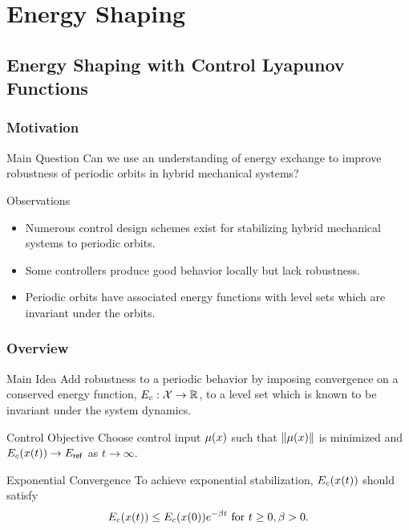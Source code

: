 \section{Energy Shaping}
\showtoc

\subsection{Energy Shaping with Control Lyapunov Functions}

\begin{frame}[t]
  \frametitle{Motivation}
  \begin{block}{Main Question}
    Can we use an understanding of energy exchange to improve robustness  of
    periodic orbits in hybrid mechanical systems?
  \end{block}

  \begin{block}{Observations}
    \begin{itemize}
    \item Numerous control design schemes exist for stabilizing hybrid mechanical
      systems to periodic orbits.
    \item Some controllers produce good behavior locally but lack robustness.
    \item Periodic orbits have associated energy functions with level sets which
      are invariant under the orbits.
    \end{itemize}
  \end{block}
\end{frame}

\begin{frame}[t]
  \frametitle{Overview}
  \begin{block}{Main Idea}
    Add robustness to a periodic behavior by imposing convergence on a conserved
    energy function, $E_{c} : \mathcal{X} \to \mathbb{R}$, to a level set which is known to be
    invariant under the system dynamics.
  \end{block}
  
  \begin{block}{Control Objective}
    Choose control input $\mu(x)$ such that $\| \mu(x) \|$ is minimized and
    $E_{c}(x(t)) \to E_{\mathsf{ref}}$ as $t \to \infty$.
  \end{block}

  \begin{block}{Exponential Convergence}
    To achieve exponential stabilization, $E_{c}(x(t))$ should satisfy\vspace{-.4em}
    \begin{align*}
      E_{c}(x(t)) \leq E_{c}(x(0)) e^{-\beta t} \mbox{ for } t \geq 0, \beta > 0.
    \end{align*}
  \end{block}
\end{frame}

